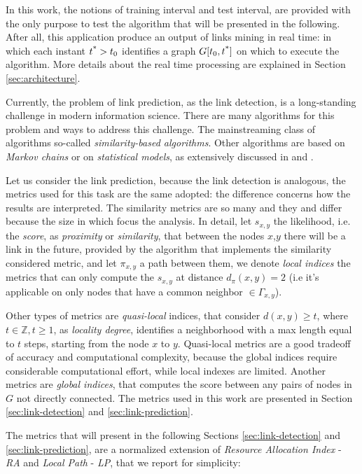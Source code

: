 In this work, the notions of training interval and test interval, are provided with the only purpose to test the algorithm that will be presented in the following. After all, this application produce an output of links mining in real time: in which each instant $t\textsuperscript{*}>t_{0}$ identifies a graph $G[t_{0},t\textsuperscript{*}]$ on which to execute the algorithm. More details about the real time processing are explained in Section \ref{sec:architecture}.

Currently, the problem of link prediction, as the link detection, is a long-standing challenge in modern information science. There are many algorithms for this problem and ways to address this challenge. The mainstreaming class of algorithms so-called \textit{similarity-based algorithms}. Other algorithms are based on \textit{Markov chains} or on \textit{statistical models}, as extensively discussed in \cite{Liben-Nowell} and \cite{Lu2011}.

Let us consider the link prediction, because the link detection is analogous, the metrics used for this task are the same adopted: the difference concerns how the results are interpreted. The similarity metrics are so many and they and differ because the size in which focus the analysis. In detail, let $s_{x,y}$ the likelihood, i.e. the \textit{score}, as \textit{proximity} or \textit{similarity}, that between the nodes $x$,$y$ there will be a link in the future, provided by the algorithm that implements the similarity considered metric, and let $\pi_{x,y}$ a path between them, we denote \textit{local indices} the metrics that can only compute the $s_{x,y}$ at distance $d_{\pi}(x,y) = 2$ (i.e it's applicable on only nodes that have a common neighbor $\in \Gamma_{x,y}$). 

Other types of metrics are \textit{quasi-local} indices, that consider $d(x,y) \geq t$, where $t\in \mathbb{Z}, t\geq 1 $, as \textit{locality degree}, identifies a neighborhood with a max length equal to $t$ steps, starting from the node $x$ to $y$. Quasi-local metrics are a good tradeoff of accuracy and computational complexity, because the global indices require considerable computational effort, while local indexes are limited. Another metrics are \textit{global indices}, that computes the score between any pairs of nodes in $G$ not directly connected\cite{Lu2011}. The metrics used in this work are presented in Section \ref{sec:link-detection} and \ref{sec:link-prediction}.

The metrics that will present in the following Sections \ref{sec:link-detection} and \ref{sec:link-prediction}, are a normalized extension of \textit{Resource Allocation Index} - \textit{RA} \cite{Lu2011,zhou2009predicting} and        \textit{Local Path} - \textit{LP}\cite{Lu2011,zhou2009predicting,lu2009similarity}, that we report for simplicity:

